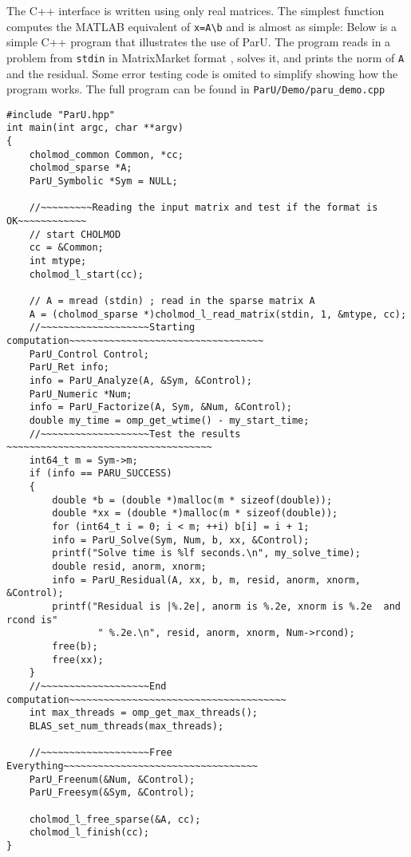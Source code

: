 \documentclass[12pt]{article}
\begin{document}
The C++ interface is written using only real matrices.  
The simplest function computes the MATLAB equivalent of
\verb'x=A\b' and is almost as simple:
Below is a simple C++ program that illustrates the use of ParU.  The
program reads in a problem from \verb'stdin' in MatrixMarket
format \cite{BoisvertPozoRemingtonBarrettDongarra97}, solves it, and prints the
norm of \verb'A' and the residual. 
Some error testing code is omited to simplify showing how the program works. 
The full program can be found in 
\verb'ParU/Demo/paru_demo.cpp'
\begin{verbatim}
#include "ParU.hpp"
int main(int argc, char **argv)
{
    cholmod_common Common, *cc;
    cholmod_sparse *A;
    ParU_Symbolic *Sym = NULL;

    //~~~~~~~~~Reading the input matrix and test if the format is OK~~~~~~~~~~~~
    // start CHOLMOD
    cc = &Common;
    int mtype;
    cholmod_l_start(cc);

    // A = mread (stdin) ; read in the sparse matrix A
    A = (cholmod_sparse *)cholmod_l_read_matrix(stdin, 1, &mtype, cc);
    //~~~~~~~~~~~~~~~~~~~Starting computation~~~~~~~~~~~~~~~~~~~~~~~~~~~~~~~~~~
    ParU_Control Control;
    ParU_Ret info;
    info = ParU_Analyze(A, &Sym, &Control);
    ParU_Numeric *Num;
    info = ParU_Factorize(A, Sym, &Num, &Control);
    double my_time = omp_get_wtime() - my_start_time;
    //~~~~~~~~~~~~~~~~~~~Test the results ~~~~~~~~~~~~~~~~~~~~~~~~~~~~~~~~~~~~
    int64_t m = Sym->m;
    if (info == PARU_SUCCESS)
    {
        double *b = (double *)malloc(m * sizeof(double));
        double *xx = (double *)malloc(m * sizeof(double));
        for (int64_t i = 0; i < m; ++i) b[i] = i + 1;
        info = ParU_Solve(Sym, Num, b, xx, &Control);
        printf("Solve time is %lf seconds.\n", my_solve_time);
        double resid, anorm, xnorm;
        info = ParU_Residual(A, xx, b, m, resid, anorm, xnorm, &Control);
        printf("Residual is |%.2e|, anorm is %.2e, xnorm is %.2e  and rcond is"
                " %.2e.\n", resid, anorm, xnorm, Num->rcond);
        free(b);
        free(xx);
    }
    //~~~~~~~~~~~~~~~~~~~End computation~~~~~~~~~~~~~~~~~~~~~~~~~~~~~~~~~~~~~~
    int max_threads = omp_get_max_threads();
    BLAS_set_num_threads(max_threads);

    //~~~~~~~~~~~~~~~~~~~Free Everything~~~~~~~~~~~~~~~~~~~~~~~~~~~~~~~~~~
    ParU_Freenum(&Num, &Control);
    ParU_Freesym(&Sym, &Control);

    cholmod_l_free_sparse(&A, cc);
    cholmod_l_finish(cc);
}
\end{verbatim}
\end{document}
